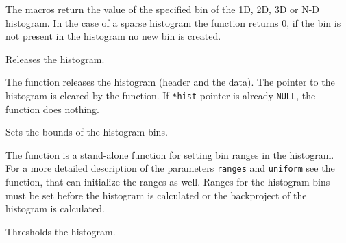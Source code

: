 \begin{description}
\end{description}

The macros return the value of the specified bin of the 1D, 2D, 3D or N-D histogram. In the case of a sparse histogram the function returns 0, if the bin is not present in the histogram no new bin is created.

\ifC
{}
Releases the histogram.


\begin{description}
\end{description}

The function releases the histogram (header and the data). The pointer to the histogram is cleared by the function. If \texttt{*hist} pointer is already \texttt{NULL}, the function does nothing.

Sets the bounds of the histogram bins.


\begin{description}
\end{description}

The function is a stand-alone function for setting bin ranges in the histogram. For a more detailed description of the parameters \texttt{ranges} and \texttt{uniform} see the  function, that can initialize the ranges as well. Ranges for the histogram bins must be set before the histogram is calculated or the backproject of the histogram is calculated.

\fi

Thresholds the histogram.


\begin{description}
\end{description}

